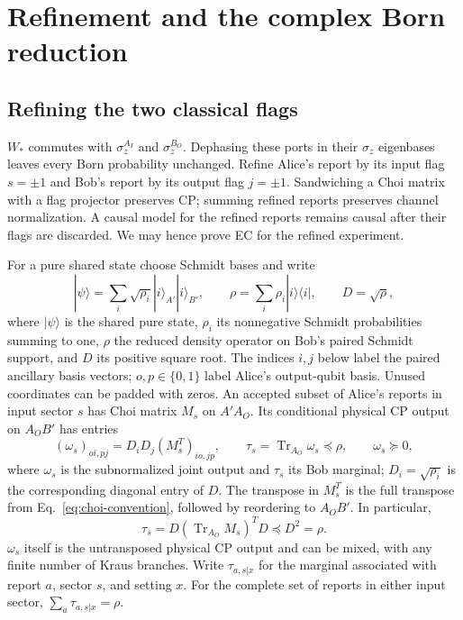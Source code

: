 \documentclass[11pt]{article}
\newcommand{\Tr}{\operatorname{Tr}}
\begin{document}
\section{Refinement and the complex Born reduction}
\subsection{Refining the two classical flags}
$W_*$ commutes with $\sigma_z^{A_I}$ and $\sigma_z^{B_O}$. Dephasing these ports in their $\sigma_z$ eigenbases leaves every Born probability unchanged. Refine Alice's report by its input flag $s=\pm1$ and Bob's report by its output flag $j=\pm1$. Sandwiching a Choi matrix with a flag projector preserves CP; summing refined reports preserves channel normalization. A causal model for the refined reports remains causal after their flags are discarded. We may hence prove EC for the refined experiment.

For a pure shared state choose Schmidt bases and write
\begin{equation}
 |\psi\rangle=\sum_i\sqrt{\rho_i}|i\rangle_{A'}|i\rangle_{B'},
 \qquad\rho=\sum_i\rho_i|i\rangle\langle i|,\qquad D=\sqrt\rho,
 \label{eq:schmidt}
\end{equation}
where $|\psi\rangle$ is the shared pure state, $\rho_i$ its nonnegative Schmidt probabilities summing to one, $\rho$ the reduced density operator on Bob's paired Schmidt support, and $D$ its positive square root. The indices $i,j$ below label the paired ancillary basis vectors; $o,p\in\{0,1\}$ label Alice's output-qubit basis. Unused coordinates can be padded with zeros. An accepted subset of Alice's reports in input sector $s$ has Choi matrix $M_s$ on $A'A_O$. Its conditional physical CP output on $A_OB'$ has entries
\begin{equation}
 (\omega_s)_{o i,p j}=D_iD_j(M_s^T)_{i o,j p},\qquad
 \tau_s=\Tr_{A_O}\omega_s\preceq\rho,\qquad\omega_s\succeq0,
 \label{eq:sigma-choi}
\end{equation}
where $\omega_s$ is the subnormalized joint output and $\tau_s$ its Bob marginal; $D_i=\sqrt{\rho_i}$ is the corresponding diagonal entry of $D$. The transpose in $M_s^T$ is the full transpose from Eq.~\eqref{eq:choi-convention}, followed by reordering to $A_OB'$. In particular,
\begin{equation}
 \tau_s=D(\Tr_{A_O}M_s)^T D\preceq D^2=\rho.
 \label{eq:tau-bound}
\end{equation}
$\omega_s$ itself is the untransposed physical CP output and can be mixed, with any finite number of Kraus branches. Write $\tau_{a,s|x}$ for the marginal associated with report $a$, sector $s$, and setting $x$. For the complete set of reports in either input sector, $\sum_a\tau_{a,s|x}=\rho$.
\end{document}
